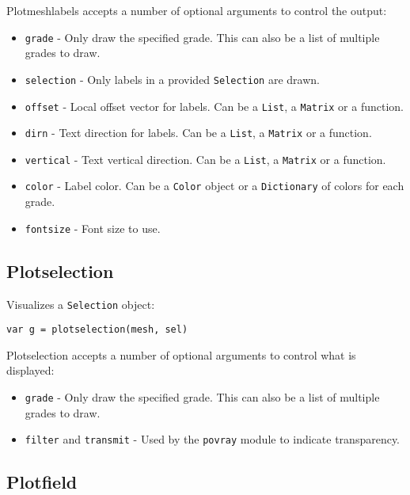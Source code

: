 Plotmeshlabels accepts a number of optional arguments to control the
output:

\begin{itemize}

\item
  \texttt{grade} - Only draw the specified grade. This can also be a
  list of multiple grades to draw.
\item
  \texttt{selection} - Only labels in a provided \texttt{Selection} are
  drawn.
\item
  \texttt{offset} - Local offset vector for labels. Can be a
  \texttt{List}, a \texttt{Matrix} or a function.
\item
  \texttt{dirn} - Text direction for labels. Can be a \texttt{List}, a
  \texttt{Matrix} or a function.
\item
  \texttt{vertical} - Text vertical direction. Can be a \texttt{List}, a
  \texttt{Matrix} or a function.
\item
  \texttt{color} - Label color. Can be a \texttt{Color} object or a
  \texttt{Dictionary} of colors for each grade.
\item
  \texttt{fontsize} - Font size to use.
\end{itemize}

\hypertarget{plotselection}{%
\subsection{Plotselection}\label{plotselection}}

Visualizes a \texttt{Selection} object:

\begin{lstlisting}
var g = plotselection(mesh, sel)
\end{lstlisting}

Plotselection accepts a number of optional arguments to control what is
displayed:

\begin{itemize}

\item
  \texttt{grade} - Only draw the specified grade. This can also be a
  list of multiple grades to draw.
\item
  \texttt{filter} and \texttt{transmit} - Used by the \texttt{povray}
  module to indicate transparency.
\end{itemize}

\hypertarget{plotfield}{%
\subsection{Plotfield}\label{plotfield}}


